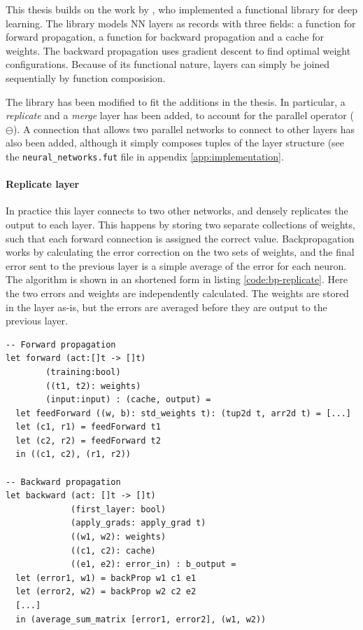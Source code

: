 This thesis builds on the work by \textcite{Minh2018}, who 
implemented a functional library for deep learning.
The library models \gls{NN} layers as records with three fields:
a function for forward propagation, a function for backward propagation
and a cache for weights. 
The backward propagation uses gradient descent to find optimal
weight configurations.
Because of its functional nature, layers can simply be joined 
sequentially by function composision.

The library has been modified to fit the additions in the thesis.
In particular, a \textit{replicate} and a \textit{merge} layer has
been added, to account for the parallel operator ($\ominus$).
A connection that allows two parallel networks to connect to other
layers has also been added, although it simply composes tuples of
the layer structure (see the \texttt{neural\_networks.fut} file in
appendix \ref{app:implementation}.

\paragraph{Replicate layer}
In practice this layer connects to two other networks, and densely
replicates the output to each layer.
This happens by storing two separate collections of weights, such
that each forward connection is assigned the correct value.
Backpropagation works by calculating the error correction on the
two sets of weights, and the final error sent to the previous layer
is a simple average of the error for each neuron. 
The algorithm is shown in an shortened form in listing \ref{code:bp-replicate}.
Here the two errors and weights are independently calculated.
The weights are stored in the layer as-is, but the errors are 
averaged before they are output to the previous layer.

\lstset{language=,caption=Part of the forward and backward propagation algorithms for the replicate layer. Abbreviated for clarity.}
\begin{lstlisting}
-- Forward propagation
let forward (act:[]t -> []t)
	    (training:bool)
	    ((t1, t2): weights)
	    (input:input) : (cache, output) =
  let feedForward ((w, b): std_weights t): (tup2d t, arr2d t) = [...]
  let (c1, r1) = feedForward t1
  let (c2, r2) = feedForward t2
  in ((c1, c2), (r1, r2))

-- Backward propagation
let backward (act: []t -> []t)
             (first_layer: bool)
             (apply_grads: apply_grad t)
             ((w1, w2): weights)
             ((c1, c2): cache)
             ((e1, e2): error_in) : b_output =
  let (error1, w1) = backProp w1 c1 e1
  let (error2, w2) = backProp w2 c2 e2
  [...]
  in (average_sum_matrix [error1, error2], (w1, w2))
\end{lstlisting} \label{code:bp-replicate}

